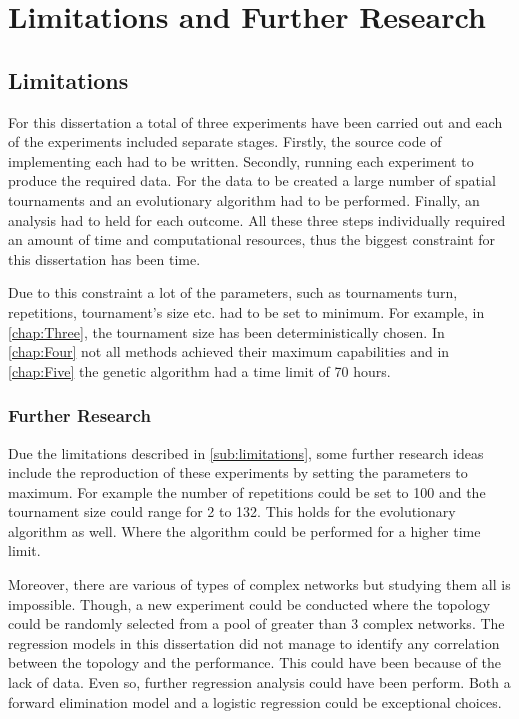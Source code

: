 \section{Limitations and Further Research}
\subsection{Limitations}
\label{sub:limitations}
For this dissertation a total of three experiments have been carried out and
each of the experiments included separate stages. Firstly, the source code of implementing
each had to be written. Secondly, running each experiment to produce the required data.
For the data to be created a large number of spatial
tournaments and an evolutionary algorithm had to be performed. Finally, an
analysis had to held for each outcome. All these three steps individually required
an amount of time and computational resources, thus the biggest constraint for
this dissertation has been time.

Due to this constraint a lot of the parameters, such as tournaments turn, repetitions,
tournament's size etc. had to be set to minimum. For example, in \autoref{chap:Three},
the tournament size has been deterministically chosen. In \autoref{chap:Four}
not all methods achieved their maximum capabilities and in \autoref{chap:Five} the
genetic algorithm had a time limit of 70 hours.

\subsubsection{Further Research}

Due the limitations described in \autoref{sub:limitations}, some further
research ideas include the reproduction of these experiments by setting the
parameters to maximum. For example the number of repetitions could be set to 100
and the tournament size could range for 2 to 132. This holds for the evolutionary
algorithm as well. Where the algorithm could be performed for a higher time limit.

Moreover, there are various of types of complex networks but studying them all
is impossible. Though, a new experiment could be conducted where the topology
could be randomly selected from a pool of greater than 3 complex networks. The
regression models in this dissertation did not manage to identify any correlation
between the topology and the performance.
This could have been because of the lack of data. Even so, further regression
analysis could have been perform. Both a forward elimination model and a logistic
regression could be exceptional choices.

